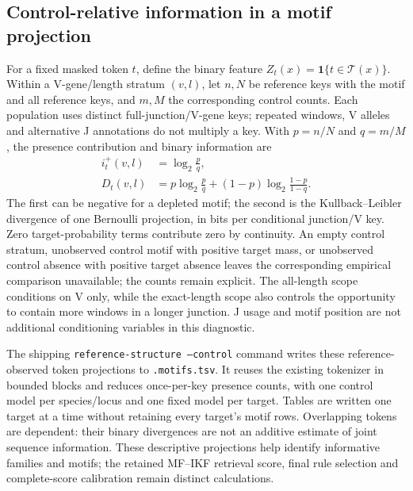 \documentclass[10pt,a4paper]{article}
\theoremstyle{definition}
\begin{document}
\subsection{Control-relative information in a motif projection}
For a fixed masked token $t$, define the binary feature $Z_t(x)=\mathbf1\{t\in\mathcal T(x)\}$.
Within a V-gene/length stratum $(v,l)$, let $n,N$ be reference keys with the motif and all reference keys, and $m,M$ the corresponding control counts.
Each population uses distinct full-junction/V-gene keys; repeated windows, V alleles and alternative J annotations do not multiply a key.
With $p=n/N$ and $q=m/M$, the presence contribution and binary information are
\begin{align}
 i_t^+(v,l)&=\log_2\frac{p}{q},\nonumber\\
 D_t(v,l)&=p\log_2\frac{p}{q}+(1-p)\log_2\frac{1-p}{1-q}.
 \label{eq:binary-motif-information}
\end{align}
The first can be negative for a depleted motif; the second is the Kullback--Leibler divergence of one Bernoulli projection, in bits per conditional junction/V key.
Zero target-probability terms contribute zero by continuity.
An empty control stratum, unobserved control motif with positive target mass, or unobserved control absence with positive target absence leaves the corresponding empirical comparison unavailable; the counts remain explicit.
The all-length scope conditions on V only, while the exact-length scope also controls the opportunity to contain more windows in a longer junction.
J usage and motif position are not additional conditioning variables in this diagnostic.

The shipping \texttt{reference-structure --control} command writes these reference-observed token projections to \texttt{.motifs.tsv}.
It reuses the existing tokenizer in bounded blocks and reduces once-per-key presence counts, with one control model per species/locus and one fixed model per target.
Tables are written one target at a time without retaining every target's motif rows.
Overlapping tokens are dependent: their binary divergences are not an additive estimate of joint sequence information.
These descriptive projections help identify informative families and motifs; the retained MF--IKF retrieval score, final rule selection and complete-score calibration remain distinct calculations.
\end{document}
